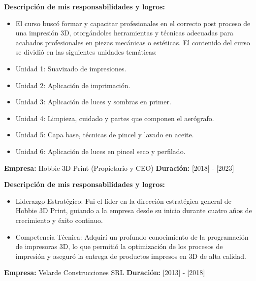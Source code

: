 \documentclass[a4paper,10pt]{article}
\begin{document}
\textbf{Descripción de mis responsabilidades y logros:}
\begin{itemize}
    \item El curso buscó formar y capacitar profesionales en el correcto post proceso de una impresión 3D, otorgándoles herramientas y técnicas adecuadas para acabados profesionales en piezas mecánicas o estéticas. El contenido del curso se dividió en las siguientes unidades temáticas:
    \item Unidad 1: Suavizado de impresiones.
    \item Unidad 2: Aplicación de imprimación.
    \item Unidad 3: Aplicación de luces y sombras en primer.
    \item Unidad 4: Limpieza, cuidado y partes que componen el aerógrafo.
    \item Unidad 5: Capa base, técnicas de pincel y lavado en aceite.
    \item Unidad 6: Aplicación de luces en pincel seco y perfilado.
\end{itemize}
\vspace{15pt} %

\textbf{Empresa:} Hobbie 3D Print (Propietario y CEO)  
\textbf{Duración:} [2018] - [2023]

\textbf{Descripción de mis responsabilidades y logros:}
\begin{itemize}
    \item Liderazgo Estratégico: Fui el líder en la dirección estratégica general de Hobbie 3D Print, guiando a la empresa desde su inicio durante cuatro años de crecimiento y éxito continuo.
    \item Competencia Técnica: Adquirí un profundo conocimiento de la programación de impresoras 3D, lo que permitió la optimización de los procesos de impresión y aseguró la entrega de productos impresos en 3D de alta calidad.
\end{itemize}

\textbf{Empresa:} Velarde Construcciones SRL  
\textbf{Duración:} [2013] - [2018]
\end{document}
